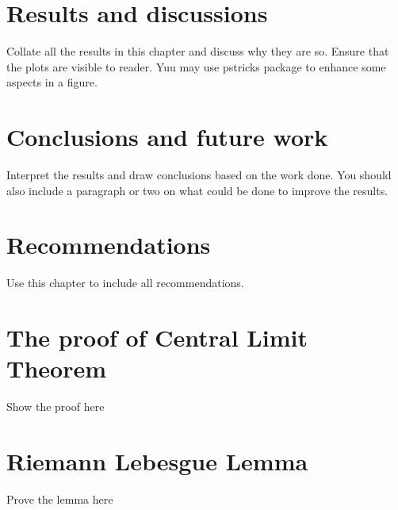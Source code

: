 \documentclass{book}
\begin{document}
\chapter{Results and discussions}
Collate all the results in this chapter and discuss why they are so. Ensure that the plots are visible to reader. Yuu may use pstricks package to enhance some aspects in a figure. 
\chapter{Conclusions and future work}
Interpret the results and draw conclusions based on the work done. You should also include a paragraph or two on what could be done to improve the results. 

\chapter{Recommendations}
Use this chapter to include all recommendations.


\begin{appendices}
\chapter{The proof of Central Limit Theorem}
Show the proof here
\chapter{Riemann Lebesgue Lemma}
	\label{appB}
Prove the lemma here
\end{appendices}
\end{document}
